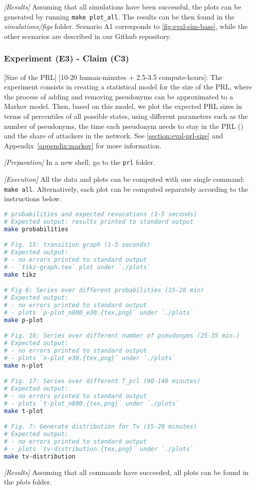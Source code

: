 \textit{[Results]} Assuming that all simulations have been successful, the plots
can be generated by running \texttt{make plot\_all}. The results can be then
found in the \emph{simulations/figs} folder. Scenario A1 corresponds to
\cref{fig:eval-sim-base}, while the other scenarios are described in our Github
repository.

\subsubsection{Experiment (E3) - Claim (C3)}
\label{artifact:prl}
[Size of the \acs{PRL}] [10-20 human-minutes + 2.5-3.5 compute-hours]: The
experiment consists in creating a statistical model for the size of the
\ac{PRL}, where the process of adding and removing pseudonyms can be
approximated to a Markov model. Then, based on this model, we plot the expected
\ac{PRL} sizes in terms of percentiles of all possible states, using different
parameters such as the number of pseudonyms, the time each pseudonym needs to
stay in the \ac{PRL} (\paramtprl{}) and the share of attackers in the network.
See \cref{section:eval-prl-size} and Appendix~\ref{appendix:markov} for more
information.

\textit{[Preparation]} In a new shell, go to the \texttt{prl} folder.

\textit{[Execution]} All the data and plots can be computed with one single
command: \texttt{make all}. Alternatively, each plot can be computed separately
according to the instructions below.

\begin{lstlisting}[language=bash]
# probabilities and expected revocations (1-5 seconds)
# Expected output: results printed to standard output
make probabilities

# Fig. 15: transition graph (1-5 seconds)
# Expected output:
# - no errors printed to standard output
# - `tikz-graph.tex` plot under `./plots`
make tikz

# Fig 6: Series over different probabilities (15-20 min)
# Expected output: 
# - no errors printed to standard output
# - plots `p-plot_n800_e30.{tex,png}` under `./plots`
make p-plot

# Fig. 16: Series over different number of pseudonyms (25-35 min.)
# Expected output:
# - no errors printed to standard output
# - plots `n-plot_e30.{tex,png}` under `./plots`
make n-plot

# Fig. 17: Series over different T_prl (90-140 minutes)
# Expected output:
# - no errors printed to standard output
# - plots `t-plot_n800.{tex,png}` under `./plots`
make t-plot

# Fig. 7: Generate distribution for Tv (15-20 minutes)
# Expected output:
# - no errors printed to standard output
# - plots `tv-distribution.{tex,png}` under `./plots`
make tv-distribution
\end{lstlisting}

\textit{[Results]} Assuming that all commands have succeeded, all plots can be
found in the \emph{plots} folder.
